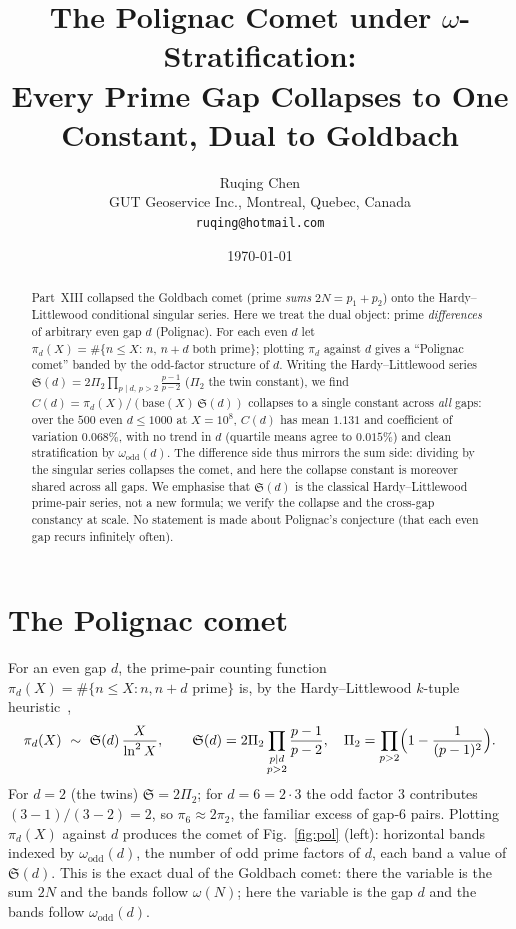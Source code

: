 \documentclass[11pt]{article}
\title{The Polignac Comet under $\omega$-Stratification:\\
Every Prime Gap Collapses to One Constant, Dual to Goldbach}
\author{Ruqing Chen\\
\small GUT Geoservice Inc., Montreal, Quebec, Canada\\
\small \texttt{ruqing@hotmail.com}}
\date{\today}
\begin{document}
\maketitle

\begin{abstract}
Part~XIII collapsed the Goldbach comet (prime \emph{sums} $2N=p_1+p_2$) onto the
Hardy--Littlewood conditional singular series. Here we treat the dual object: prime
\emph{differences} of arbitrary even gap $d$ (Polignac). For each even $d$ let
$\pi_d(X)=\#\{n\le X:\,n,\,n+d\text{ both prime}\}$; plotting $\pi_d$ against $d$
gives a ``Polignac comet'' banded by the odd-factor structure of $d$. Writing the
Hardy--Littlewood series $\mathfrak{S}(d)=2\Pi_2\prod_{p\mid d,\,p>2}\frac{p-1}{p-2}$
($\Pi_2$ the twin constant), we find $C(d)=\pi_d(X)/(\mathrm{base}(X)\,\mathfrak{S}(d))$
collapses to a single constant across \emph{all} gaps: over the $500$ even
$d\le1000$ at $X=10^{8}$, $C(d)$ has mean $1.131$ and coefficient of variation
$0.068\%$, with no trend in $d$ (quartile means agree to $0.015\%$) and clean
stratification by $\omega_{\mathrm{odd}}(d)$. The difference side thus mirrors the
sum side: dividing by the singular series collapses the comet, and here the
collapse constant is moreover shared across all gaps. We emphasise that
$\mathfrak{S}(d)$ is the classical Hardy--Littlewood prime-pair series, not a new
formula; we verify the collapse and the cross-gap constancy at scale. No statement
is made about Polignac's conjecture (that each even gap recurs infinitely often).
\end{abstract}

\section{The Polignac comet}

For an even gap $d$, the prime-pair counting function $\pi_d(X)=\#\{n\le X:n,n+d
\text{ prime}\}$ is, by the Hardy--Littlewood $k$-tuple heuristic~\cite{HL},
\[
  \pi_d(X)\ \sim\ \mathfrak{S}(d)\,\frac{X}{\ln^2 X},\qquad
  \mathfrak{S}(d)=2\Pi_2\prod_{\substack{p\mid d\\ p>2}}\frac{p-1}{p-2},\quad
  \Pi_2=\prod_{p>2}\Bigl(1-\frac1{(p-1)^2}\Bigr).
\]
For $d=2$ (the twins) $\mathfrak{S}=2\Pi_2$; for $d=6=2\cdot3$ the odd factor $3$
contributes $(3-1)/(3-2)=2$, so $\pi_6\approx2\pi_2$, the familiar excess of
gap-$6$ pairs. Plotting $\pi_d(X)$ against $d$ produces the comet of
Fig.~\ref{fig:pol} (left): horizontal bands indexed by $\omega_{\mathrm{odd}}(d)$,
the number of odd prime factors of $d$, each band a value of $\mathfrak{S}(d)$.
This is the exact dual of the Goldbach comet: there the variable is the sum $2N$
and the bands follow $\omega(N)$; here the variable is the gap $d$ and the bands
follow $\omega_{\mathrm{odd}}(d)$.
\end{document}
